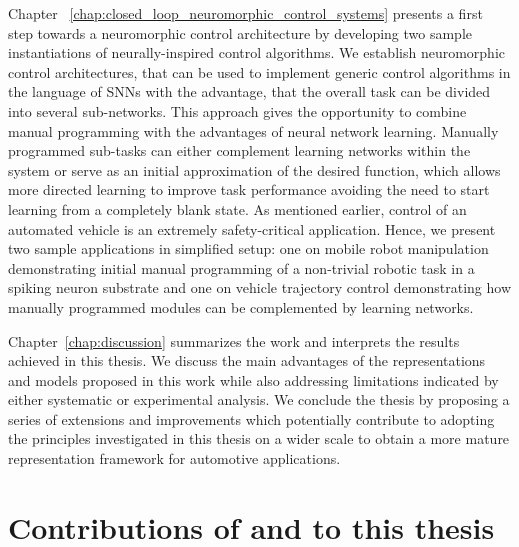 Chapter ~\ref{chap:closed_loop_neuromorphic_control_systems} presents a first step towards a neuromorphic control architecture by developing two sample instantiations of neurally-inspired control algorithms.
We establish neuromorphic control architectures, that can be used to implement generic control algorithms in the language of \acp{SNN} with the advantage, that the overall task can be divided into several sub-networks.
This approach gives the opportunity to combine manual programming with the advantages of neural network learning.
Manually programmed sub-tasks can either complement learning networks within the system or serve as an initial approximation of the desired function, which allows more directed learning to improve task performance avoiding the need to start learning from a completely blank state.
As mentioned earlier, control of an automated vehicle is an extremely safety-critical application.
Hence, we present two sample applications in simplified setup: one on mobile robot manipulation demonstrating initial manual programming of a non-trivial robotic task in a spiking neuron substrate and one on vehicle trajectory control demonstrating how manually programmed modules can be complemented by learning networks.

Chapter~\ref{chap:discussion} summarizes the work and interprets the results achieved in this thesis.
We discuss the main advantages of the representations and models proposed in this work while also addressing limitations indicated by either systematic or experimental analysis.
We conclude the thesis by proposing a series of extensions and improvements which potentially contribute to adopting the principles investigated in this thesis on a wider scale to obtain a more mature representation framework for automotive applications.

\section{Contributions of and to this thesis}%
\label{sec:contributions_of_and_to_this_thesis}

